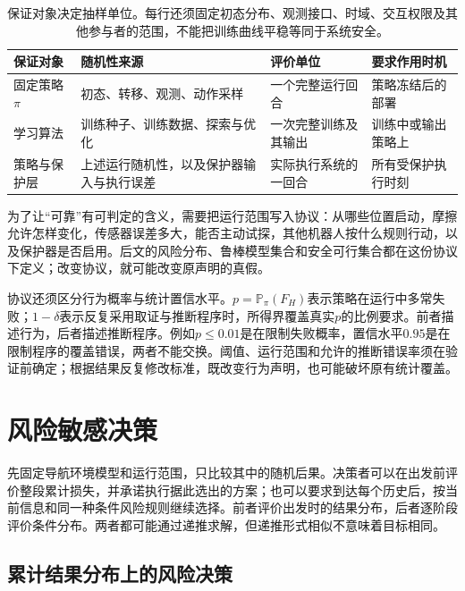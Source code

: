 \begin{table}[htbp]
  \centering
  \begin{tabularx}{\linewidth}{@{}>{\raggedright\arraybackslash}p{20mm}XXX@{}}
    \toprule
    保证对象 & 随机性来源 & 评价单位 & 要求作用时机 \\
    \midrule
    固定策略$\pi$ & 初态、转移、观测、动作采样 & 一个完整运行回合 & 策略冻结后的部署 \\
    学习算法 & 训练种子、训练数据、探索与优化 & 一次完整训练及其输出 & 训练中或输出策略上 \\
    策略与保护层 & 上述运行随机性，以及保护器输入与执行误差 & 实际执行系统的一回合 & 所有受保护执行时刻 \\
    \bottomrule
  \end{tabularx}
  \caption{保证对象决定抽样单位。每行还须固定初态分布、观测接口、时域、交互权限及其他参与者的范围，不能把训练曲线平稳等同于系统安全。}
  \label{tab:rl-trustworthy-guarantee-objects}
\end{table}

为了让“可靠”有可判定的含义，需要把运行范围写入协议：从哪些位置启动，摩擦允许怎样变化，传感器误差多大，能否主动试探，其他机器人按什么规则行动，以及保护器是否启用。后文的风险分布、鲁棒模型集合和安全可行集合都在这份协议下定义；改变协议，就可能改变原声明的真假。

协议还须区分行为概率与统计置信水平。$p=\mathbb P_\pi(F_H)$表示策略在运行中多常失败；$1-\delta$表示反复采用取证与推断程序时，所得界覆盖真实$p$的比例要求。前者描述行为，后者描述推断程序。例如$p\leq0.01$是在限制失败概率，置信水平$0.95$是在限制程序的覆盖错误，两者不能交换。阈值、运行范围和允许的推断错误率须在验证前确定；根据结果反复修改标准，既改变行为声明，也可能破坏原有统计覆盖。

\section{风险敏感决策}
\label{sec:rl-trustworthy-risk}

先固定导航环境模型和运行范围，只比较其中的随机后果。决策者可以在出发前评价整段累计损失，并承诺执行据此选出的方案；也可以要求到达每个历史后，按当前信息和同一种条件风险规则继续选择。前者评价出发时的结果分布，后者逐阶段评价条件分布。两者都可能通过递推求解，但递推形式相似不意味着目标相同。

\subsection{累计结果分布上的风险决策}
\label{sec:rl-trustworthy-static-risk}

